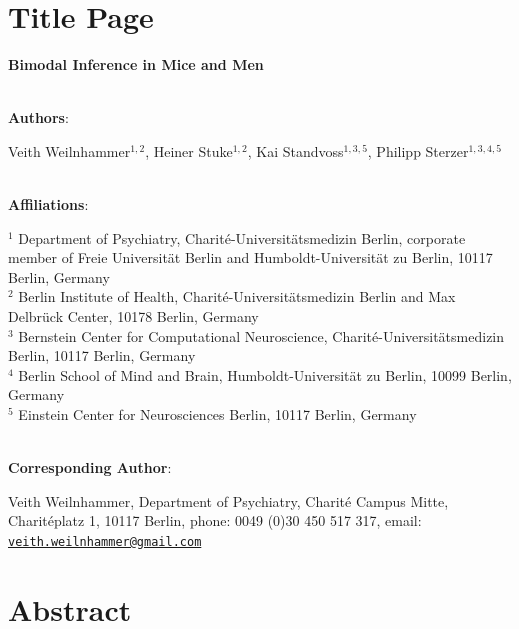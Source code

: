 \documentclass[
]{article}
\author{}
\date{\vspace{-2.5em}}
\begin{document}
\hypertarget{title-page}{%
\section{Title Page}\label{title-page}}

\textbf{Bimodal Inference in Mice and Men}\\
\strut \\

\textbf{Authors}:

Veith Weilnhammer\(^{1,2}\), Heiner Stuke\(^{1,2}\), Kai
Standvoss\(^{1,3,5}\), Philipp Sterzer\(^{1,3,4,5}\)\\
\strut \\
\textbf{Affiliations}:

\(^{1}\) Department of Psychiatry, Charité-Universitätsmedizin Berlin,
corporate member of Freie Universität Berlin and Humboldt-Universität zu
Berlin, 10117 Berlin, Germany\\
\(^{2}\) Berlin Institute of Health, Charité-Universitätsmedizin Berlin
and Max Delbrück Center, 10178 Berlin, Germany\\
\(^{3}\) Bernstein Center for Computational Neuroscience,
Charité-Universitätsmedizin Berlin, 10117 Berlin, Germany\\
\(^{4}\) Berlin School of Mind and Brain, Humboldt-Universität zu
Berlin, 10099 Berlin, Germany\\
\(^{5}\) Einstein Center for Neurosciences Berlin, 10117 Berlin,
Germany\\
\strut \\

\textbf{Corresponding Author}:

Veith Weilnhammer, Department of Psychiatry, Charité Campus Mitte,
Charitéplatz 1, 10117 Berlin, phone: 0049 (0)30 450 517 317, email:
\href{mailto:veith.weilnhammer@gmail.com}{\nolinkurl{veith.weilnhammer@gmail.com}}\\

\newpage

\linenumbers

\hypertarget{abstract}{%
\section{Abstract}\label{abstract}}
\end{document}
